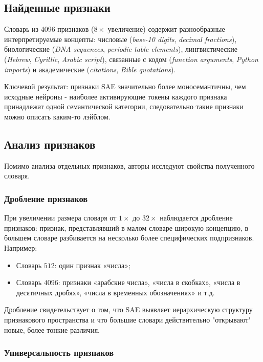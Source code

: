 \documentclass[a4paper,14pt]{extreport}
\begin{document}
\subsection{Найденные признаки}

Словарь из 4096 признаков ($8\times$ увеличение) содержит разнообразные интерпретируемые концепты:
числовые (\textit{base-10 digits}, \textit{decimal fractions}),
биологические (\textit{DNA sequences}, \textit{periodic table elements}),
лингвистические (\textit{Hebrew}, \textit{Cyrillic}, \textit{Arabic script}),
связанные с кодом (\textit{function arguments}, \textit{Python imports})
и академические (\textit{citations}, \textit{Bible quotations}).

Ключевой результат: признаки SAE значительно более моносемантичны, чем исходные нейроны -
наиболее активирующие токены каждого признака принадлежат одной семантической категории,
следовательно такие признаки можно описать каким-то лэйблом.

\subsection{Анализ признаков}

Помимо анализа отдельных признаков, авторы исследуют свойства полученного словаря.

\subsubsection{Дробление признаков}

При увеличении размера словаря от $1\times$ до $32\times$ наблюдается дробление признаков:
признак, представлявший в малом словаре широкую концепцию, в большем словаре
разбивается на несколько более специфических подпризнаков. Например:
\begin{itemize}
    \item Словарь $512$: один признак «числа»;
    \item Словарь $4096$: признаки «арабские числа», «числа в скобках»,
          «числа в десятичных дробях», «числа в временных обозначениях» и т.д.
\end{itemize}
Дробление свидетельствует о том, что SAE выявляет иерархическую структуру признакового
пространства и что большие словари действительно "открывают" новые, более тонкие различия.

\subsubsection{Универсальность признаков}
\end{document}
